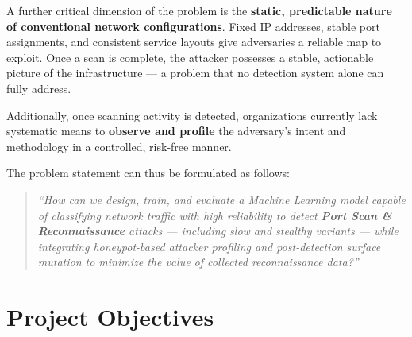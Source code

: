 \documentclass[12pt,a4paper]{article}
\begin{document}
A further critical dimension of the problem is the \textbf{static, predictable
nature of conventional network configurations}. Fixed IP addresses, stable
port assignments, and consistent service layouts give adversaries a reliable
map to exploit. Once a scan is complete, the attacker possesses a stable,
actionable picture of the infrastructure --- a problem that no detection system
alone can fully address.

Additionally, once scanning activity is detected, organizations currently
lack systematic means to \textbf{observe and profile} the adversary's intent
and methodology in a controlled, risk-free manner.

The problem statement can thus be formulated as follows:

\begin{quote}
\itshape
``How can we design, train, and evaluate a Machine Learning model capable of
classifying network traffic with high reliability to detect
\textbf{Port Scan \& Reconnaissance} attacks --- including slow and stealthy
variants --- while integrating honeypot-based attacker profiling and
post-detection surface mutation to minimize the value of collected
reconnaissance data?''
\end{quote}


\section{Project Objectives}
\end{document}
